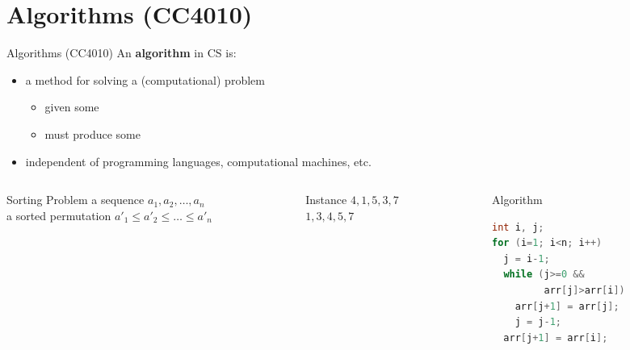 \documentclass[aspectratio=169]{beamer}
\begin{document}
\frame[plain]{\titlepage}


\section{Algorithms (CC4010)}

\begin{frame}[fragile]{Algorithms (CC4010)}
An \alert{\textbf{algorithm}} in CS is:

\begin{itemize}
  \item a \alert{method} for solving a (computational) problem
  \begin{itemize}
    \item given some 
    \item must produce some 
  \end{itemize}
  \item \alert{independent} of programming languages, computational machines, etc.
\end{itemize}

\begin{columns}[T]
\begin{column}{0.31\textwidth}
  \begin{alertblock}{Sorting Problem}
   a sequence $a_1, a_2, \ldots , a_n$
  \\
   a sorted permutation $a'_1 \leq a'_2 \leq \ldots \leq a'_n$
  \end{alertblock}
\end{column}\begin{column}{0.31\textwidth}
  \begin{exampleblock}{Instance}
   $4,1,5,3,7$
  \\
   $1,3,4,5,7$
  \end{exampleblock}
\end{column}\begin{column}{0.31\textwidth}
  \begin{block}{Algorithm}
  ~\\[-5pt]
  \begin{lstlisting}[language=C++,emph={[1]arr}]
int i, j;
for (i=1; i<n; i++)
  j = i-1;
  while (j>=0 &&
         arr[j]>arr[i])
    arr[j+1] = arr[j];
    j = j-1; 
  arr[j+1] = arr[i];
  \end{lstlisting}~\\[-20pt]
  \end{block}
\end{column}
\end{columns}

\end{frame}
\end{document}

